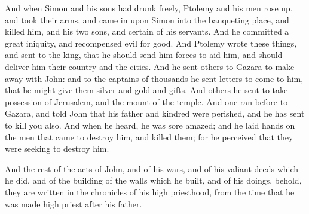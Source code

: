 {And when Simon and his sons had drunk freely, Ptolemy and his men rose up, and took their arms, and came in upon Simon into the banqueting place, and killed him, and his two sons, and certain of his servants.
And he committed a great iniquity, and recompensed evil for good.
And Ptolemy wrote these things, and sent to the king, that he should send him forces to aid him, and should deliver him their country and the cities.
And he sent others to Gazara to make away with John: and to the captains of thousands he sent letters to come to him, that he might give them silver and gold and gifts.
And others he sent to take possession of Jerusalem, and the mount of the temple.
And one ran before to Gazara, and told John that his father and kindred were perished, and he has sent to kill you also.
And when he heard, he was sore amazed; and he laid hands on the men that came to destroy him, and killed them; for he perceived that they were seeking to destroy him.
\par }{\PP {}And the rest of the acts of John, and of his wars, and of his valiant deeds which he did, and of the building of the walls which he built, and of his doings,
behold, they are written in the
 chronicles of his high priesthood, from the time that he was made high priest after his father.
\par }